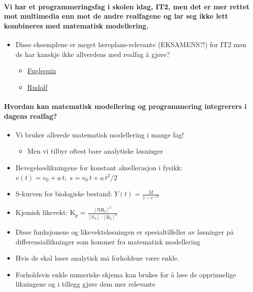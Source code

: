 \documentclass[%
oneside,                 %
final,                   %
10pt,norsk]{article}
\begin{document}

\paragraph{Vi har et programmeringsfag i skolen idag, IT2, men det er mer rettet mot multimedia enn mot de andre realfagene og lar seg ikke lett kombineres med matematisk modellering.}
\begin{itemize}
\item Disse eksemplene er meget læreplans-relevante (EKSAMENS?!) for IT2 men de har kanskje ikke allverdens med realfag å gjøre?
\begin{itemize}

 \item \href{{kode/fugler.html}}{Fuglequiz}

 \item \href{{kode/oppgaver_animasjon_9.html}}{Rudolf}
\end{itemize}

\noindent
\end{itemize}

\noindent

\paragraph{Hvordan kan matematisk modellering og programmering integrerers i dagens realfag?}
\begin{itemize}
\item Vi bruker allerede matematisk modellering i mange fag!
\begin{itemize}

 \item Men vi tilbyr oftest bare analytiske løsninger
\end{itemize}

\noindent
\end{itemize}

\noindent
\begin{itemize}
\item Bevegelseslikningene for konstant aksellerasjon i fysikk: $v(t)= v_0 + a\,t;\; s = v_0\,t + a\,t^2/2$

\item S-kurven for biologiske bestand: $Y(t)= \frac{M}{1-e^{-rt}}$

\item Kjemisk likevekt: $\mathrm{K_p=\frac{[NH_3]^2}{[N_2]\cdot[H_2]^3}}$

\item Disse funksjonene og likevektsløsningen er spesialtilfeller av løsninger på differensiallikninger som kommer fra matematisk modellering

\item Hvis de skal løses analytisk må forholdene være enkle.

\item Forholdsvis enkle numeriske skjema kan brukes for å løse de opprinnelige likningene og i tillegg gjøre dem mer relevante
\end{itemize}
\end{document}
